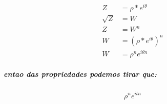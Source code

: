 \documentclass[12pt,twoside, a4paper, twocolumn]{article}
\newcommand{\drawvector} [9] [color=cyan] {
    \draw[line width=1.5pt,#1,-stealth](axis cs: #2, #3)--(axis cs: #4, #5) node[anchor=south west]{$#6$};

    

\ifthenelse{\equal{#7}{true}}{
    \draw[line width=1pt,#1, dashed](axis cs: #4, #5)--(axis cs: #4, 0) node[anchor= north west]{$#8$};
    \draw[line width=1pt,#1, dashed](axis cs: #4, #5)--(axis cs: 0, #5) node[anchor=south east]{$#9$};
    }
    {}
}
\begin{document}
\begin{equation*}
    \begin{aligned}
        Z        & = \rho * e^{i \theta}                \\
        \sqrt{Z} & = W                                  \\
        Z        & = W^n                                \\
        W        & =  \left(\rho * e^{i\theta}\right)^n \\
        W        & =\rho ^n e^{i \theta n}
    \end{aligned}
\end{equation*}

\subparagraph*{entao das propriedades podemos tirar que:}

\begin{equation}
    \rho^n e^{itn}
\end{equation}




%  






\end{document}
